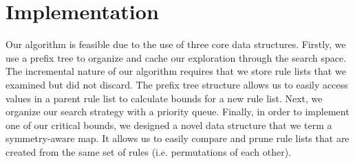 \documentclass[format=sigconf]{acmart}
\begin{document}
\section{Implementation}
Our algorithm is feasible due to the use of three core data structures.
Firstly, we use a prefix tree to organize and cache our exploration through the search space.
The incremental nature of our algorithm requires that we store rule lists that we examined but did not discard.
The prefix tree structure allows us to easily access values in a parent rule list to calculate bounds for a new rule list.
Next, we organize our search strategy with a priority queue.
Finally, in order to implement one of our critical bounds, we designed a novel data structure that we term a symmetry-aware map.
It allows us to easily compare and prune rule lists that are created from the same set of rules (i.e. permutations of each other).
\end{document}

